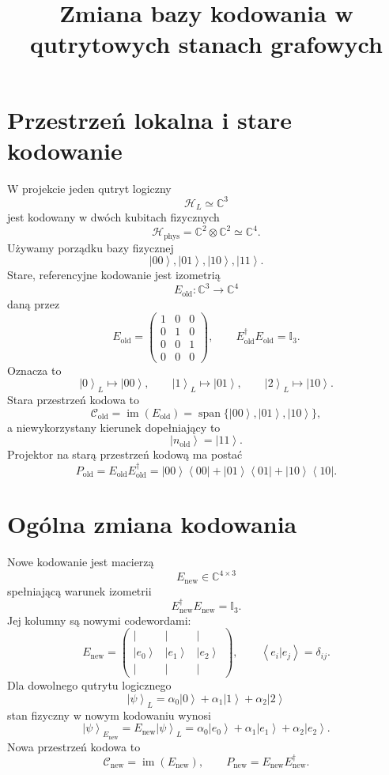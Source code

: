 \documentclass[11pt,a4paper]{article}
\title{Zmiana bazy kodowania w qutrytowych stanach grafowych}
\author{}
\date{}
\newcommand{\C}{\mathbb{C}}
\newcommand{\id}{\mathbb{I}}
\newcommand{\Eold}{E_{\mathrm{old}}}
\newcommand{\Enew}{E_{\mathrm{new}}}
\newcommand{\Cold}{\mathcal{C}_{\mathrm{old}}}
\newcommand{\Cnew}{\mathcal{C}_{\mathrm{new}}}
\newcommand{\im}{\operatorname{im}}
\newcommand{\ket}[1]{\left|#1\right\rangle}
\newcommand{\bra}[1]{\left\langle#1\right|}
\newcommand{\braket}[1]{\left\langle#1\right\rangle}
\begin{document}
\maketitle

\section{Przestrzeń lokalna i stare kodowanie}

W projekcie jeden qutryt logiczny
\[
    \mathcal{H}_L \simeq \C^3
\]
jest kodowany w dwóch kubitach fizycznych
\[
    \mathcal{H}_{\mathrm{phys}}
    =
    \C^2 \otimes \C^2
    \simeq
    \C^4 .
\]
Używamy porządku bazy fizycznej
\[
    \ket{00},\ket{01},\ket{10},\ket{11}.
\]
Stare, referencyjne kodowanie jest izometrią
\[
    \Eold:\C^3\longrightarrow \C^4
\]
daną przez
\[
    \Eold
    =
    \begin{pmatrix}
        1 & 0 & 0\\
        0 & 1 & 0\\
        0 & 0 & 1\\
        0 & 0 & 0
    \end{pmatrix},
    \qquad
    \Eold^\dagger \Eold = \id_3 .
\]
Oznacza to
\[
    \ket{0}_L\mapsto \ket{00},\qquad
    \ket{1}_L\mapsto \ket{01},\qquad
    \ket{2}_L\mapsto \ket{10}.
\]
Stara przestrzeń kodowa to
\[
    \Cold
    =
    \im(\Eold)
    =
    \operatorname{span}\{\ket{00},\ket{01},\ket{10}\},
\]
a niewykorzystany kierunek dopełniający to
\[
    \ket{n_{\mathrm{old}}}=\ket{11}.
\]
Projektor na starą przestrzeń kodową ma postać
\[
    P_{\mathrm{old}}
    =
    \Eold\Eold^\dagger
    =
    \ket{00}\bra{00}
    +
    \ket{01}\bra{01}
    +
    \ket{10}\bra{10}.
\]

\section{Ogólna zmiana kodowania}

Nowe kodowanie jest macierzą
\[
    \Enew\in\C^{4\times 3}
\]
spełniającą warunek izometrii
\[
    \Enew^\dagger \Enew = \id_3.
\]
Jej kolumny są nowymi codewordami:
\[
    \Enew
    =
    \begin{pmatrix}
        \vert & \vert & \vert\\
        \ket{e_0} & \ket{e_1} & \ket{e_2}\\
        \vert & \vert & \vert
    \end{pmatrix},
    \qquad
    \braket{e_i|e_j}=\delta_{ij}.
\]
Dla dowolnego qutrytu logicznego
\[
    \ket{\psi}_L
    =
    \alpha_0\ket{0}
    +
    \alpha_1\ket{1}
    +
    \alpha_2\ket{2}
\]
stan fizyczny w nowym kodowaniu wynosi
\[
    \ket{\psi}_{\Enew}
    =
    \Enew\ket{\psi}_L
    =
    \alpha_0\ket{e_0}
    +
    \alpha_1\ket{e_1}
    +
    \alpha_2\ket{e_2}.
\]
Nowa przestrzeń kodowa to
\[
    \Cnew=\im(\Enew),\qquad
    P_{\mathrm{new}}=\Enew\Enew^\dagger.
\]
\end{document}
